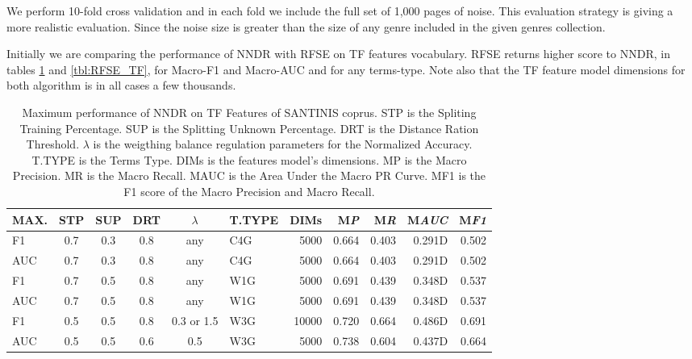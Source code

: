 We perform  10-fold cross validation and in each fold we include the full set of 1,000 pages of noise. This evaluation strategy is giving a more realistic evaluation. Since the noise size is greater than the size of any genre included in the given genres collection.

Initially we are comparing the performance of NNDR with RFSE on TF features vocabulary. RFSE returns higher score to NNDR, in tables \ref{tbl:NNDR_TF} and \ref{tbl:RFSE_TF}, for Macro-F1 and Macro-AUC and for any terms-type. Note also that the TF feature model dimensions for both algorithm is in all cases a few thousands.

\pagebreak

\begin{table}
\center
\begin{tabular}{|l|cccc|lr|rrrr|}
\hline
MAX. & STP & SUP & DRT & $\lambda$ & T.TYPE & DIMs & M\emph{P} & M\emph{R} & M\emph{AUC} & M\emph{F1} \\
\hline
F1 & 0.7 & 0.3 & 0.8 & any & C4G & 5000 & 0.664 & 0.403 & 0.291D & 0.502 \\
AUC & 0.7 & 0.3 & 0.8 & any & C4G & 5000 & 0.664 & 0.403 & 0.291D & 0.502 \\
F1 & 0.7 & 0.5 & 0.8 & any & W1G & 5000 & 0.691 & 0.439 & 0.348D & 0.537 \\
AUC & 0.7 & 0.5 & 0.8 & any & W1G & 5000 & 0.691 & 0.439 & 0.348D & 0.537 \\
F1 & 0.5 & 0.5 & 0.8 & 0.3 or 1.5 & W3G & 10000 & 0.720 & 0.664 & 0.486D & 0.691 \\
AUC & 0.5 & 0.5 & 0.6 & 0.5 & W3G & 5000 & 0.738 & 0.604 & 0.437D & 0.664 \\
\hline
\end{tabular}
\caption {Maximum performance of NNDR on TF Features of SANTINIS coprus. STP is the Spliting Training Percentage. SUP is the Splitting Unknown Percentage. DRT is the Distance Ration Threshold. $\lambda$ is the weigthing balance regulation parameters for the Normalized Accuracy. T.TYPE is the Terms Type. DIMs is the features model's dimensions. MP is the Macro Precision. MR is the Macro Recall. MAUC is the Area Under the Macro PR Curve. MF1 is the F1 score of the Macro Precision and Macro Recall.}
\label{tbl:NNDR_TF}
\end{table}

